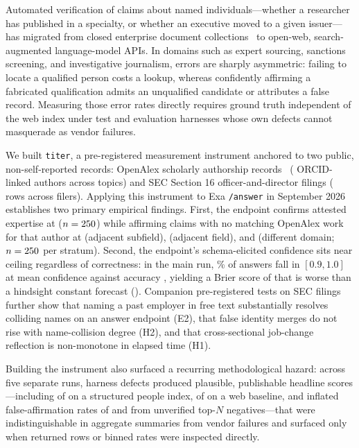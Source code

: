 \documentclass[11pt]{article}
\begin{document}
Automated verification of claims about named individuals---whether a researcher has published in a specialty, or whether an executive moved to a given issuer---has migrated from closed enterprise document collections~\citep{craswell2005trec,balog2006formal,balog2012expertise} to open-web, search-augmented language-model APIs. In domains such as expert sourcing, sanctions screening, and investigative journalism, errors are sharply asymmetric: failing to locate a qualified person costs a lookup, whereas confidently affirming a fabricated qualification admits an unqualified candidate or attributes a false record. Measuring those error rates directly requires ground truth independent of the web index under test and evaluation harnesses whose own defects cannot masquerade as vendor failures.

We built \texttt{titer}, a pre-registered measurement instrument anchored to two public, non-self-reported records: OpenAlex scholarly authorship records~\citep{priem2022openalex} (\tiAuthors{} ORCID-linked authors across \tiTopics{} topics) and SEC Section 16 officer-and-director filings (\tiCorpusRows{} rows across \tiCorpusPeople{} filers). Applying this instrument to Exa \texttt{/answer} in September 2026 establishes two primary empirical findings. First, the endpoint confirms attested expertise at \tiAttRate{} ($n=250{}$) while affirming claims with no matching OpenAlex work for that author at \tiNearRate{} (adjacent subfield), \tiFarRate{} (adjacent field), and \tiCtlRate{} (different domain; $n=250{}$ per stratum). Second, the endpoint's schema-elicited confidence sits near ceiling regardless of correctness: in the main run, \tiCalTopShare{}\% of answers fall in $[0.9, 1.0]$ at mean confidence \tiCalTopConf{} against accuracy \tiCalTopAcc{}, yielding a Brier score of \tiBrier{} that is worse than a hindsight constant forecast (\tiBrierBase{}). Companion pre-registered tests on SEC filings further show that naming a past employer in free text substantially resolves colliding names on an answer endpoint (E2), that false identity merges do not rise with name-collision degree (H2), and that cross-sectional job-change reflection is non-monotone in elapsed time (H1).

Building the instrument also surfaced a recurring methodological hazard: across five separate runs, harness defects produced plausible, publishable headline scores---including \tiPRunOneCorrect{} of \tiPRunOneN{} on a structured people index, \tiWebCorrect{} of \tiWebN{} on a web baseline, and inflated false-affirmation rates of \tiRawFar{} and \tiRawNear{} from unverified top-$N$ negatives---that were indistinguishable in aggregate summaries from vendor failures and surfaced only when returned rows or binned rates were inspected directly.
\end{document}
